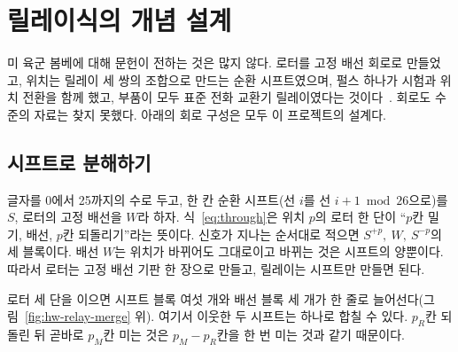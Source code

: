 \section{릴레이식의 개념 설계}\label{sec:hw-relay}

미 육군 봄베에 대해 문헌이 전하는 것은 많지 않다. 로터를 고정 배선 회로로 만들었고, 위치는 릴레이 세 쌍의
조합으로 만드는 순환 시프트였으며, 펄스 하나가 시험과 위치 전환을 함께 했고, 부품이 모두 표준 전화 교환기
릴레이였다는 것이다~\cite{dturing2021army}. 회로도 수준의 자료는 찾지 못했다. 아래의 회로 구성은 모두 이
프로젝트의 설계다.

\subsection{시프트로 분해하기}

글자를 0에서 25까지의 수로 두고, 한 칸 순환 시프트(선 $i$를 선 $i+1 \bmod 26$으로)를 $S$, 로터의 고정 배선을
$W$라 하자. 식~\eqref{eq:through}은 위치 $p$의 로터 한 단이 ``$p$칸 밀기, 배선, $p$칸 되돌리기''라는 뜻이다.
신호가 지나는 순서대로 적으면 $S^{+p},\ W,\ S^{-p}$의 세 블록이다. 배선 $W$는 위치가 바뀌어도 그대로이고
바뀌는 것은 시프트의 양뿐이다. 따라서 로터는 고정 배선 기판 한 장으로 만들고, 릴레이는 시프트만 만들면 된다.

로터 세 단을 이으면 시프트 블록 여섯 개와 배선 블록 세 개가 한 줄로 늘어선다(그림~\ref{fig:hw-relay-merge} 위).
여기서 이웃한 두 시프트는 하나로 합칠 수 있다. $p_R$칸 되돌린 뒤 곧바로 $p_M$칸 미는 것은 $p_M - p_R$칸을
한 번 미는 것과 같기 때문이다.

